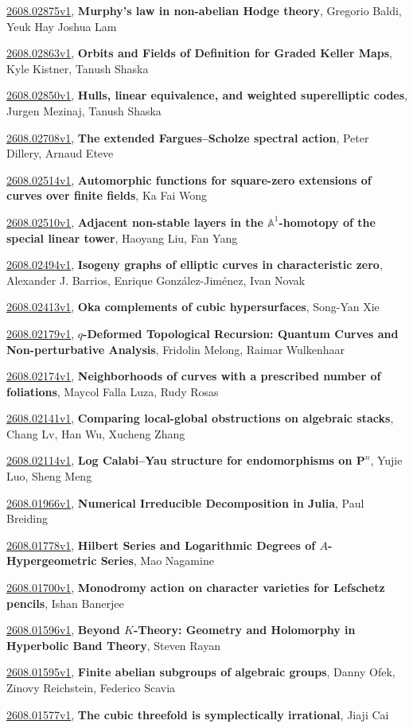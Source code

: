 \documentclass[9pt, a4paper]{article}
\theoremstyle{plain}
\theoremstyle{definition}
\theoremstyle{remark}
\newcommand{\arxiv}[3]{\href{https://arxiv.org/abs/#1}{#1}, \textbf{\textcolor{arxivblue}{#2}}, #3}
\begin{document}
\arxiv{2608.02875v1}{Murphy's law in non-abelian Hodge theory}{Gregorio Baldi, Yeuk Hay Joshua Lam}

\arxiv{2608.02863v1}{Orbits and Fields of Definition for Graded Keller Maps}{Kyle Kistner, Tanush Shaska}

\arxiv{2608.02850v1}{Hulls, linear equivalence, and weighted superelliptic codes}{Jurgen Mezinaj, Tanush Shaska}

\arxiv{2608.02708v1}{The extended Fargues--Scholze spectral action}{Peter Dillery, Arnaud Eteve}

\arxiv{2608.02514v1}{Automorphic functions for square-zero extensions of curves over finite fields}{Ka Fai Wong}

\arxiv{2608.02510v1}{Adjacent non-stable layers in the $\mathbb{A}^1$-homotopy of the special linear tower}{Haoyang Liu, Fan Yang}

\arxiv{2608.02494v1}{Isogeny graphs of elliptic curves in characteristic zero}{Alexander J. Barrios, Enrique González-Jiménez, Ivan Novak}

\arxiv{2608.02413v1}{Oka complements of cubic hypersurfaces}{Song-Yan Xie}

\arxiv{2608.02179v1}{$q$-Deformed Topological Recursion: Quantum Curves and Non-perturbative Analysis}{Fridolin Melong, Raimar Wulkenhaar}

\arxiv{2608.02174v1}{Neighborhoods of curves with a prescribed number of foliations}{Maycol Falla Luza, Rudy Rosas}

\arxiv{2608.02141v1}{Comparing local-global obstructions on algebraic stacks}{Chang Lv, Han Wu, Xucheng Zhang}

\arxiv{2608.02114v1}{Log Calabi--Yau structure for endomorphisms on $\mathbf{P}^n$}{Yujie Luo, Sheng Meng}

\arxiv{2608.01966v1}{Numerical Irreducible Decomposition in Julia}{Paul Breiding}

\arxiv{2608.01778v1}{Hilbert Series and Logarithmic Degrees of $A$-Hypergeometric Series}{Mao Nagamine}

\arxiv{2608.01700v1}{Monodromy action on character varieties for Lefschetz pencils}{Ishan Banerjee}

\arxiv{2608.01596v1}{Beyond $K$-Theory: Geometry and Holomorphy in Hyperbolic Band Theory}{Steven Rayan}

\arxiv{2608.01595v1}{Finite abelian subgroups of algebraic groups}{Danny Ofek, Zinovy Reichstein, Federico Scavia}

\arxiv{2608.01577v1}{The cubic threefold is symplectically irrational}{Jiaji Cai}
\end{document}
